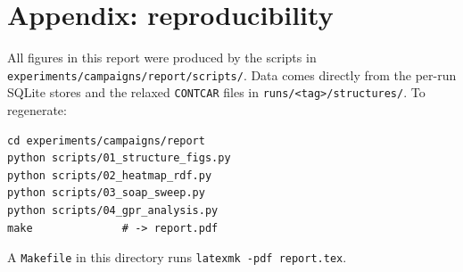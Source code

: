 \documentclass[11pt,a4paper]{article}
\begin{document}
\appendix
\section{Appendix: reproducibility}

All figures in this report were produced by the scripts in
\texttt{experiments/campaigns/report/scripts/}. Data comes directly
from the per-run SQLite stores and the relaxed \texttt{CONTCAR}
files in \texttt{runs/<tag>/structures/}. To regenerate:

\begin{verbatim}
cd experiments/campaigns/report
python scripts/01_structure_figs.py
python scripts/02_heatmap_rdf.py
python scripts/03_soap_sweep.py
python scripts/04_gpr_analysis.py
make              # -> report.pdf
\end{verbatim}

\noindent A \texttt{Makefile} in this directory runs
\texttt{latexmk -pdf report.tex}.
\end{document}

